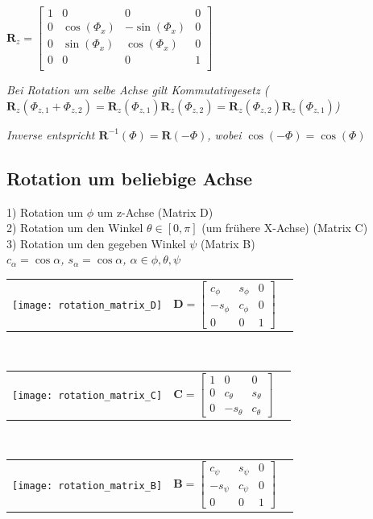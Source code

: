 $\mathbf{R}_z = \left[\begin{array}{ccc|c}
    1 & 0 & 0 & 0 \\
    0 & \cos(\Phi_x) & -\sin(\Phi_x) & 0 \\
    0 & \sin(\Phi_x) & \cos(\Phi_x) & 0 \\
    \hline
    0 & 0 & 0 & 1 \\
\end{array}\right]$

\textit{Bei Rotation um selbe Achse gilt Kommutativgesetz
($\mathbf{R}_z(\Phi_{z,1} + \Phi_{z,2}) = \mathbf{R}_z(\Phi_{z,1}) \mathbf{R}_z(\Phi_{z,2}) = \mathbf{R}_z(\Phi_{z,2}) \mathbf{R}_z(\Phi_{z,1})$)}

\textit{Inverse entspricht $\mathbf{R}^{-1}(\Phi) = \mathbf{R}(-\Phi)$,
wobei $\cos(-\Phi) = \cos(\Phi)$}

\subsection{Rotation um beliebige Achse}

1) Rotation um $\phi$ um z-Achse (Matrix D) \\
2) Rotation um den Winkel $\theta \in [0, \pi]$ (um frühere X-Achse) (Matrix C)  \\
3) Rotation um den gegeben Winkel $\psi$ (Matrix B) \\

\textit{$c_\alpha = \cos \alpha$, $s_\alpha = \cos \alpha$, $\alpha \in {\phi, \theta, \psi}$} \\

\begin{tabular}{m{3cm}CC}
    \texttt{[image: rotation\_matrix\_D]} &
    $\mathbf{D} = \begin{bmatrix}
        c_\phi & s_\phi & 0 \\
        -s_\phi & c_\phi & 0 \\
        0 & 0 & 1
    \end{bmatrix}$ \\
\end{tabular} \\
\begin{tabular}{m{3cm}CC}
    \texttt{[image: rotation\_matrix\_C]} &
    $\mathbf{C} = \begin{bmatrix}
        1 & 0 & 0 \\
        0 & c_\theta & s_\theta \\
        0 & -s_\theta & c_\theta
    \end{bmatrix}$ \\
\end{tabular} \\
\begin{tabular}{m{3cm}CC}
    \texttt{[image: rotation\_matrix\_B]} &
    $\mathbf{B} = \begin{bmatrix}
        c_\psi & s_\psi & 0 \\
        -s_\psi & c_\psi & 0 \\
        0 & 0 & 1
    \end{bmatrix}$ \\
\end{tabular} \\

